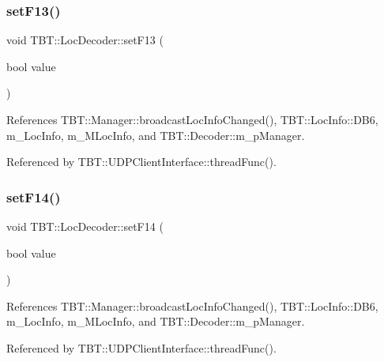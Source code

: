 \subsubsection{\texorpdfstring{set\+F13()}{setF13()}}
{\footnotesize\ttfamily void T\+B\+T\+::\+Loc\+Decoder\+::set\+F13 (\begin{DoxyParamCaption}\item[{bool}]{value }\end{DoxyParamCaption})\hspace{0.3cm}{\ttfamily [inline]}}



References T\+B\+T\+::\+Manager\+::broadcast\+Loc\+Info\+Changed(), T\+B\+T\+::\+Loc\+Info\+::\+D\+B6, m\+\_\+\+Loc\+Info, m\+\_\+\+M\+Loc\+Info, and T\+B\+T\+::\+Decoder\+::m\+\_\+p\+Manager.



Referenced by T\+B\+T\+::\+U\+D\+P\+Client\+Interface\+::thread\+Func().

\mbox{\label{classTBT_1_1LocDecoder_a4d74e6b1232f3c716bf624dc1681164a_a4d74e6b1232f3c716bf624dc1681164a}} 
\subsubsection{\texorpdfstring{set\+F14()}{setF14()}}
{\footnotesize\ttfamily void T\+B\+T\+::\+Loc\+Decoder\+::set\+F14 (\begin{DoxyParamCaption}\item[{bool}]{value }\end{DoxyParamCaption})\hspace{0.3cm}{\ttfamily [inline]}}



References T\+B\+T\+::\+Manager\+::broadcast\+Loc\+Info\+Changed(), T\+B\+T\+::\+Loc\+Info\+::\+D\+B6, m\+\_\+\+Loc\+Info, m\+\_\+\+M\+Loc\+Info, and T\+B\+T\+::\+Decoder\+::m\+\_\+p\+Manager.



Referenced by T\+B\+T\+::\+U\+D\+P\+Client\+Interface\+::thread\+Func().

\mbox{\label{classTBT_1_1LocDecoder_aee5779bd1917c16099c77b3d57aedbb8_aee5779bd1917c16099c77b3d57aedbb8}} 

